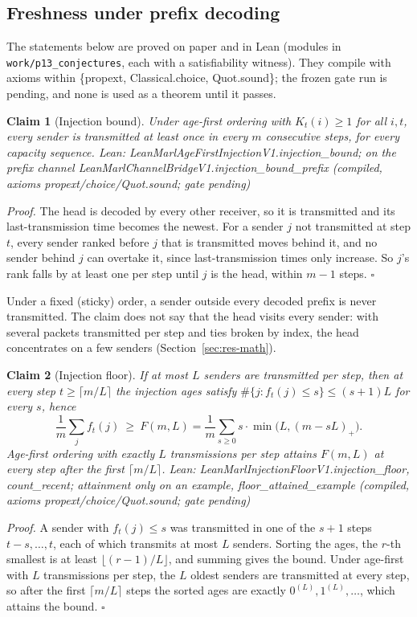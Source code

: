 \documentclass[11pt]{article}
\newtheorem{claim}{Claim}
\theoremstyle{definition}
\newcommand{\LEANC}[1]{\textsf{\footnotesize Lean: #1 (compiled, axioms propext/choice/Quot.sound; gate pending)}}
\begin{document}
\subsection{Freshness under prefix decoding}\label{sec:fresh}
The statements below are proved on paper and in Lean (modules in \texttt{work/p13\_conjectures}, each with a satisfiability
witness). They compile with axioms within \{propext, Classical.choice, Quot.sound\}; the frozen gate run is pending, and
none is used as a theorem until it passes.
\begin{claim}[Injection bound]\label{cl:inj}
Under age-first ordering with $K_t(i)\ge1$ for all $i,t$, every sender is transmitted at least once in every $m$
consecutive steps, for every capacity sequence. \LEANC{LeanMarlAgeFirstInjectionV1.injection\_bound; on the prefix channel
LeanMarlChannelBridgeV1.injection\_bound\_prefix}
\end{claim}
\emph{Proof.} The head is decoded by every other receiver, so it is transmitted and its last-transmission time becomes the
newest. For a sender $j$ not transmitted at step $t$, every sender ranked before $j$ that is transmitted moves behind it,
and no sender behind $j$ can overtake it, since last-transmission times only increase. So $j$'s rank falls by at least one
per step until $j$ is the head, within $m-1$ steps. $\square$

Under a fixed (sticky) order, a sender outside every decoded prefix is never transmitted. The claim does not say that the
head visits every sender: with several packets transmitted per step and ties broken by index, the head concentrates on
a few senders (Section~\ref{sec:res-math}).

\begin{claim}[Injection floor]\label{cl:floor}
If at most $L$ senders are transmitted per step, then at every step $t\ge\lceil m/L\rceil$ the injection ages satisfy
$\#\{j:f_t(j)\le s\}\le(s+1)L$ for every $s$, hence
\[\frac1m\sum_jf_t(j)\ \ge\ F(m,L)=\frac1m\sum_{s\ge0}s\cdot\min\big(L,(m-sL)_+\big).\]
Age-first ordering with exactly $L$ transmissions per step attains $F(m,L)$ at every step after the first
$\lceil m/L\rceil$. \LEANC{LeanMarlInjectionFloorV1.injection\_floor, count\_recent; attainment only on an example,
floor\_attained\_example}
\end{claim}
\emph{Proof.} A sender with $f_t(j)\le s$ was transmitted in one of the $s+1$ steps $t-s,\dots,t$, each of which transmits at
most $L$ senders. Sorting the ages, the $r$-th smallest is at least $\lfloor(r-1)/L\rfloor$, and summing gives the bound. Under
age-first with $L$ transmissions per step, the $L$ oldest senders are transmitted at every step, so after the first
$\lceil m/L\rceil$ steps the sorted ages are exactly $0^{(L)},1^{(L)},\dots$, which attains the bound. $\square$
\end{document}
